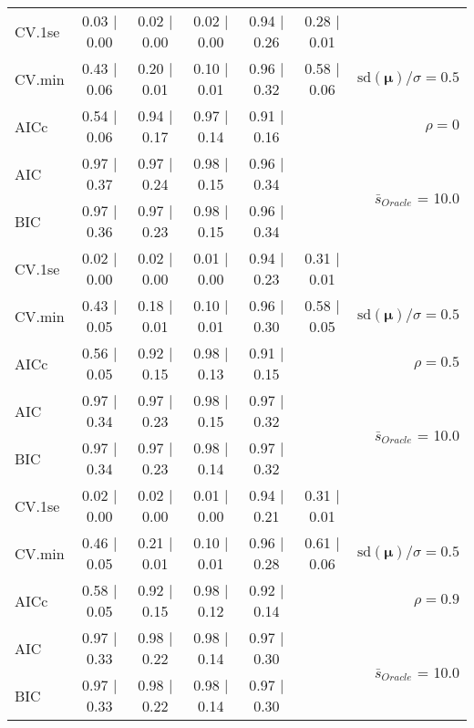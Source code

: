 \begin{table}
\begin{center}
\begin{tabular}{l*{5}{c}|r}
 \hline 
CV.1se & 0.03 $\mid$ 0.00 & 0.02 $\mid$ 0.00 & 0.02 $\mid$ 0.00 & 0.94 $\mid$ 0.26 & 0.28 $\mid$ 0.01 & \\
CV.min & 0.43 $\mid$ 0.06 & 0.20 $\mid$ 0.01 & 0.10 $\mid$ 0.01 & 0.96 $\mid$ 0.32 & 0.58 $\mid$ 0.06 &  $\mathrm{sd}(\mathbf{\mu})/\sigma=0.5$ \\
AICc & 0.54 $\mid$ 0.06 & 0.94 $\mid$ 0.17 & 0.97 $\mid$ 0.14 & 0.91 $\mid$ 0.16 & & $\rho=0$ \\
AIC & 0.97 $\mid$ 0.37 & 0.97 $\mid$ 0.24 & 0.98 $\mid$ 0.15 & 0.96 $\mid$ 0.34 & &  \multirow{2}{*}{$\bar{s}_{Oracle}$ = 10.0} \\
BIC & 0.97 $\mid$ 0.36 & 0.97 $\mid$ 0.23 & 0.98 $\mid$ 0.15 & 0.96 $\mid$ 0.34 & &  \\
 \hline 
CV.1se & 0.02 $\mid$ 0.00 & 0.02 $\mid$ 0.00 & 0.01 $\mid$ 0.00 & 0.94 $\mid$ 0.23 & 0.31 $\mid$ 0.01 & \\
CV.min & 0.43 $\mid$ 0.05 & 0.18 $\mid$ 0.01 & 0.10 $\mid$ 0.01 & 0.96 $\mid$ 0.30 & 0.58 $\mid$ 0.05 &  $\mathrm{sd}(\mathbf{\mu})/\sigma=0.5$ \\
AICc & 0.56 $\mid$ 0.05 & 0.92 $\mid$ 0.15 & 0.98 $\mid$ 0.13 & 0.91 $\mid$ 0.15 & & $\rho=0.5$ \\
AIC & 0.97 $\mid$ 0.34 & 0.97 $\mid$ 0.23 & 0.98 $\mid$ 0.15 & 0.97 $\mid$ 0.32 & &  \multirow{2}{*}{$\bar{s}_{Oracle}$ = 10.0} \\
BIC & 0.97 $\mid$ 0.34 & 0.97 $\mid$ 0.23 & 0.98 $\mid$ 0.14 & 0.97 $\mid$ 0.32 & &  \\
 \hline 
CV.1se & 0.02 $\mid$ 0.00 & 0.02 $\mid$ 0.00 & 0.01 $\mid$ 0.00 & 0.94 $\mid$ 0.21 & 0.31 $\mid$ 0.01 & \\
CV.min & 0.46 $\mid$ 0.05 & 0.21 $\mid$ 0.01 & 0.10 $\mid$ 0.01 & 0.96 $\mid$ 0.28 & 0.61 $\mid$ 0.06 &  $\mathrm{sd}(\mathbf{\mu})/\sigma=0.5$ \\
AICc & 0.58 $\mid$ 0.05 & 0.92 $\mid$ 0.15 & 0.98 $\mid$ 0.12 & 0.92 $\mid$ 0.14 & & $\rho=0.9$ \\
AIC & 0.97 $\mid$ 0.33 & 0.98 $\mid$ 0.22 & 0.98 $\mid$ 0.14 & 0.97 $\mid$ 0.30 & &  \multirow{2}{*}{$\bar{s}_{Oracle}$ = 10.0} \\
BIC & 0.97 $\mid$ 0.33 & 0.98 $\mid$ 0.22 & 0.98 $\mid$ 0.14 & 0.97 $\mid$ 0.30 & &  \\
 \hline 
\end{tabular}
\end{center}
\vspace{-1cm}
\end{table}




